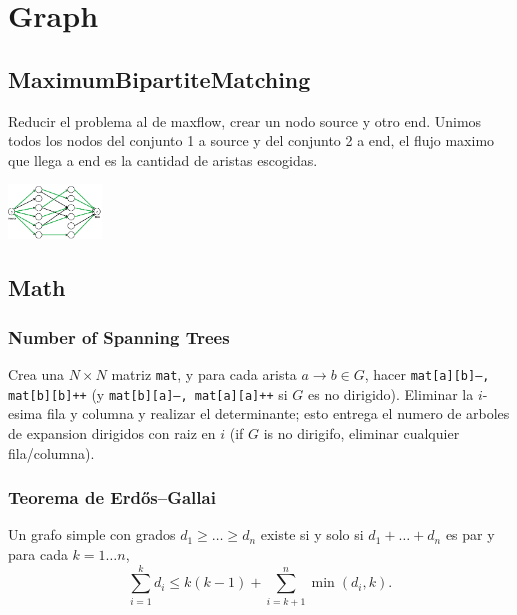 \chapter{Graph}
\section{MaximumBipartiteMatching}
Reducir el problema al de maxflow, crear un nodo source y otro end. Unimos todos los nodos del conjunto 1 a source y del conjunto 2 a end, el flujo maximo que llega a end es la cantidad de aristas escogidas.
\begin{center}
\includegraphics[width=25mm]{content/graph/maximum_matching.png}
\end{center}
\section{Math}
	\subsection{Number of Spanning Trees}
		Crea una $N\times N$ matriz \texttt{mat}, y para cada arista $a \rightarrow b \in G$, hacer
		\texttt{mat[a][b]--, mat[b][b]++} (y \texttt{mat[b][a]--, mat[a][a]++} si $G$ es no dirigido).
		Eliminar la $i$-esima fila y columna y realizar el determinante; esto entrega el numero de arboles de expansion dirigidos con raiz en $i$
		(if $G$ is no dirigifo, eliminar cualquier fila/columna).

	\subsection{Teorema de Erdős–Gallai}
		Un grafo simple con grados $d_1 \ge \dots \ge d_n$ existe si y solo si $d_1 + \dots + d_n$ es par y para cada $k = 1\dots n$,
		\[ \sum _{i=1}^{k}d_{i}\leq k(k-1)+\sum _{i=k+1}^{n}\min(d_{i},k). \]
